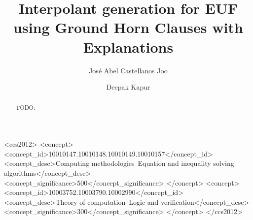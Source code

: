 \documentclass[sigconf,authordraft]{acmart}
\begin{document}
\title{Interpolant generation for EUF using Ground Horn Clauses with Explanations}

\author{Jos\'e Abel Castellanos Joo}
\author{Deepak Kapur}

\renewcommand{\shortauthors}{Castellanos and Kapur}

\begin{abstract}
  TODO:
\end{abstract}


\begin{CCSXML}
<ccs2012>
<concept>
<concept_id>10010147.10010148.10010149.10010157</concept_id>
<concept_desc>Computing methodologies~Equation and inequality solving algorithms</concept_desc>
<concept_significance>500</concept_significance>
</concept>
<concept>
<concept_id>10003752.10003790.10002990</concept_id>
<concept_desc>Theory of computation~Logic and verification</concept_desc>
<concept_significance>300</concept_significance>
</concept>
</ccs2012>
\end{CCSXML}


\end{document}
